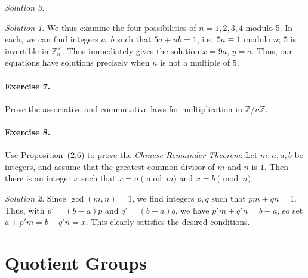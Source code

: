 \documentclass[11pt]{report}
\def\Z{\mathbb{Z}}
\theoremstyle{remark}
\newtheorem*{solution}{Solution}
\begin{document}
\begin{solution}
\begin{solution}
        We thus examine the four possibilities of $n = 1, 2, 3, 4$ modulo 5. In each,
        we can find integers $a$, $b$ such that $5a + nb = 1$, i.e.\ $5a \equiv 1$
        modulo $n$; $5$ is invertible in $\Z_n^\times$. Thus immediately gives the
        solution $x = 9a$, $y = a$. Thus, our equations have solutions precisely when
        $n$ is not a multiple of $5$.
    \end{solution}
    
    \paragraph{Exercise 7.} Prove the associative and commutative laws for
    multiplication in $\Z / n\Z$.
    

    \paragraph{Exercise 8.} Use Proposition~(2.6) to prove the \textit{Chinese
    Remainder Theorem}: Let $m, n, a, b$ be integers, and assume that the greatest
    common divisor of $m$ and $n$ is $1$. Then there is an integer $x$ such that $x =
    a \pmod{m}$ and $x = b \pmod{n}$.
    \begin{solution}
        Since $\gcd(m, n) = 1$, we find integers $p, q$ such that $pm + qn = 1$.
        Thus, with $p' = (b - a)p$ and $q' = (b - a)q$, we have $p'm + q'n = b - a$,
        so set $a + p'm = b - q'n = x$. This clearly satisfies the desired
        conditions.
    \end{solution}



    \section{Quotient Groups}
    

\end{solution}
\end{document}
